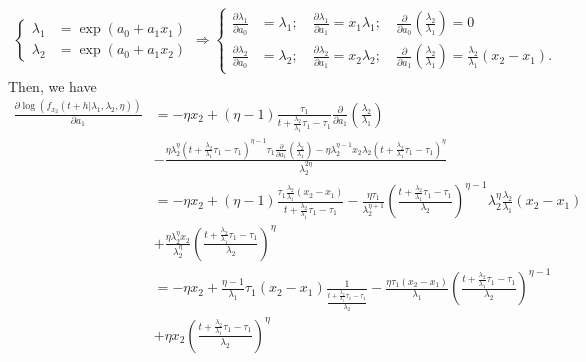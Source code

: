 \documentclass{article}
\begin{document}
\begin{align*}
\begin{cases}
\lambda_1&=\exp(a_0+a_1x_1) 
\\
\lambda_2&=\exp(a_0+a_1x_2) 
\end{cases}
\Rightarrow
\begin{cases}
 \frac{\partial \lambda_1}{\partial a_0}& = \lambda_1; \quad  \frac{\partial \lambda_1}{\partial a_1} = x_1\lambda_1;\quad  \frac{\partial}{\partial a_0}\left(\frac{\lambda_2}{\lambda_1}\right)=0
 \\
  \frac{\partial \lambda_2}{\partial a_0}& = \lambda_2; \quad  \frac{\partial \lambda_2}{\partial a_1} = x_2\lambda_2;\quad  \frac{\partial}{\partial a_1}\left(\frac{\lambda_2}{\lambda_1}\right)=\frac{\lambda_2}{\lambda_1}(x_2-x_1).
 \end{cases}
\end{align*}
Then, we have
\begin{align}
\frac{\partial \log\left(f_{x_2}(t+h|\lambda_1,\lambda_2,\eta)\right)}{\partial a_1}&=-\eta x_2 + (\eta-1)\frac{\tau_1}{t+\frac{\lambda_2}{\lambda_1}\tau_1-\tau_1}\frac{\partial}{\partial a_1}\left(\frac{\lambda_2}{\lambda_1}\right)\\
&-\frac{\eta \lambda_2^\eta\left(t+\frac{\lambda_2}{\lambda_1}\tau_1-\tau_1\right)^{\eta-1}\tau_1\frac{\partial}{\partial a_1}\left(\frac{\lambda_2}{\lambda_1}\right)-\eta\lambda_2^{\eta-1}x_2\lambda_2\left(t+\frac{\lambda_2}{\lambda_1}\tau_1-\tau_1\right)^{\eta}}{\lambda_2^{2\eta}} \nonumber
\\
&=-\eta x_2 +(\eta-1)\frac{\tau_1 \frac{\lambda_2}{\lambda_1}(x_2-x_1)}{t+\frac{\lambda_2}{\lambda_1}\tau_1-\tau_1}-\frac{\eta \tau_1}{\lambda_2^{\eta+1}}\left(\frac{t+\frac{\lambda_2}{\lambda_1}\tau_1-\tau_1}{\lambda_2}\right)^{\eta-1}\lambda_2^{\eta}\frac{\lambda_2}{\lambda_1}(x_2-x_1) \nonumber
\\
&+\frac{\eta \lambda_2^{\eta}x_2}{\lambda_2^{\eta}}\left(\frac{t+\frac{\lambda_2}{\lambda_1}\tau_1-\tau_1}{\lambda_2}\right)^{\eta} \nonumber
\\
&=-\eta x_2 + \frac{\eta-1}{\lambda_1}\tau_1(x_2-x_1)\frac{1}{\frac{t+\frac{\lambda_2}{\lambda_1}\tau_1-\tau_1}{\lambda_2}}-\frac{\eta\tau_1(x_2-x_1)}{\lambda_1}\left(\frac{t+\frac{\lambda_2}{\lambda_1}\tau_1-\tau_1}{\lambda_2}\right)^{\eta-1} \nonumber
\\
&+\eta x_2 \left(\frac{t+\frac{\lambda_2}{\lambda_1}\tau_1-\tau_1}{\lambda_2}\right)^{\eta} 
 \label{eq:dev_f2_a1}
\end{align}
\end{document}
